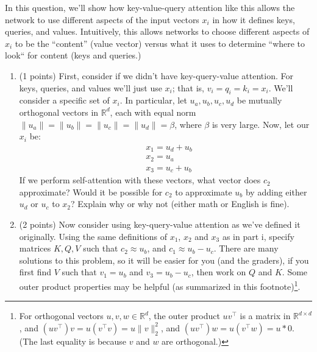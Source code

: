 \begin{enumerate}[(a)]
In this question, we'll show how key-value-query attention like this allows the network to use different aspects of the input vectors $x_i$ in how it defines keys, queries, and values.
Intuitively, this allows networks to choose different aspects of $x_i$ to be the ``content'' (value vector) versus what it uses to determine ``where to look`` for content (keys and queries.)

    \begin{enumerate}[label=\roman*.]
    \item (1 points) First, consider if we didn't have key-query-value attention. For keys, queries, and values we'll just use $x_i$; that is, $v_i=q_i=k_i=x_i$.
    We'll consider a specific set of $x_i$. In particular, let $u_a,u_b,u_c,u_d$ be mutually orthogonal vectors in $\mathbb{R}^d$, each with equal norm $\|u_a\|=\|u_b\|=\|u_c\|=\|u_d\|=\beta$, where $\beta$ is very large. 
    Now, let our $x_i$ be:
    \begin{align}
    &x_1 = u_d + u_b\\
    &x_2 = u_a \\
    &x_3 = u_c + u_b
    \end{align}
    If we perform self-attention with these vectors, what vector does $c_2$ approximate?
    Would it be possible for $c_2$ to approximate $u_b$ by adding either $u_d$ or $u_c$ to $x_2$? Explain why or why not (either math or English is fine).

    \begin{answer}
    \end{answer}


    \item (2 points) Now consider using key-query-value attention as we've defined it originally. Using the same definitions of $x_1$, $x_2$ and $x_3$ as in part i, specify matrices $K,Q,V$ such that $c_2 \approx u_b$, and $c_1\approx u_b - u_c$. There are many solutions to this problem, so it will be easier for you (and the graders), if you first find $V$ such that $v_1 = u_b$ and $v_3 = u_b - u_c$, then work on $Q$ and $K$. Some outer product properties may be helpful (as summarized in this footnote)\footnote{For orthogonal vectors $u,v,w\in\mathbb{R}^d$, the outer product $uv^\top$ is a matrix in $\mathbb{R}^{d\times d}$, and $(uv^\top)v = u(v^\top v)=u\|v\|_2^2$, and $(uv^\top)w = u(v^\top w)=u*0$. (The last equality is because $v$ and $w$ are orthogonal.)}.

    \begin{answer}
    \end{answer}


    \end{enumerate}



\end{enumerate}

